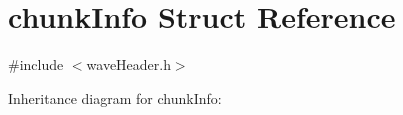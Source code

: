 \hypertarget{structchunkInfo}{}\section{chunk\+Info Struct Reference}
\label{structchunkInfo}


{\ttfamily \#include $<$wave\+Header.\+h$>$}



Inheritance diagram for chunk\+Info\+:
